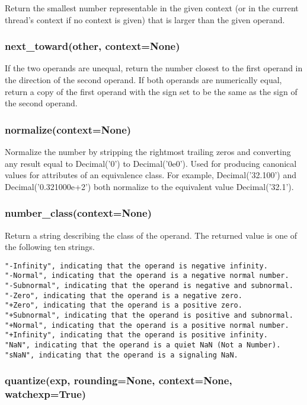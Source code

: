 Return the smallest number representable in the given context (or in the current thread’s context if no context is given) that is larger than the given operand.

\subsubsection{next\_toward(other, context=None)}

If the two operands are unequal, return the number closest to the first operand in the direction of the second operand. If both operands are numerically equal, return a copy of the first operand with the sign set to be the same as the sign of the second operand.

\subsubsection{normalize(context=None)}

Normalize the number by stripping the rightmost trailing zeros and converting any result equal to Decimal('0') to Decimal('0e0'). Used for producing canonical values for attributes of an equivalence class. For example, Decimal('32.100') and Decimal('0.321000e+2') both normalize to the equivalent value Decimal('32.1').

\subsubsection{number\_class(context=None)}

Return a string describing the class of the operand. The returned value is one of the following ten strings.

\begin{lstlisting}
"-Infinity", indicating that the operand is negative infinity.
"-Normal", indicating that the operand is a negative normal number.
"-Subnormal", indicating that the operand is negative and subnormal.
"-Zero", indicating that the operand is a negative zero.
"+Zero", indicating that the operand is a positive zero.
"+Subnormal", indicating that the operand is positive and subnormal.
"+Normal", indicating that the operand is a positive normal number.
"+Infinity", indicating that the operand is positive infinity.
"NaN", indicating that the operand is a quiet NaN (Not a Number).
"sNaN", indicating that the operand is a signaling NaN.
\end{lstlisting}


\subsubsection{quantize(exp, rounding=None, context=None, watchexp=True)}

